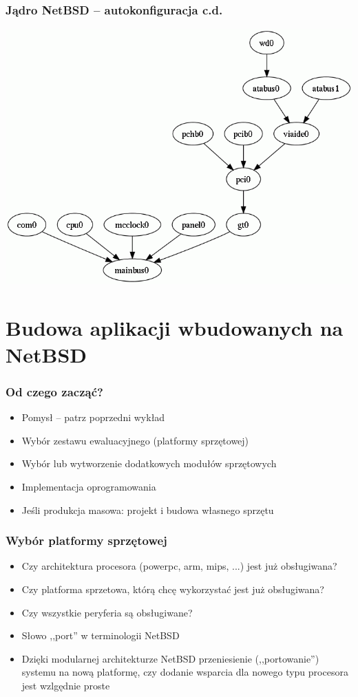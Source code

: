 \documentclass[dvipsnames,table]{beamer}
\begin{document}
\begin{frame}
\frametitle{Jądro NetBSD -- autokonfiguracja c.d.}
\begin{center}
	\includegraphics[scale=0.4]{img_cobaltdmesg.png}
\end{center}
\end{frame}

\section{Budowa aplikacji wbudowanych na NetBSD}

\begin{frame}
\frametitle{Od czego zacząć?}
\begin{itemize}
	\item Pomysł -- patrz poprzedni wykład {\Large \smiley}
	\item Wybór zestawu ewaluacyjnego (platformy sprzętowej)
	\item Wybór lub wytworzenie dodatkowych modułów sprzętowych
	\item Implementacja oprogramowania
	\item Jeśli produkcja masowa: projekt i budowa własnego sprzętu
\end{itemize}
\end{frame}	

\begin{frame}
\frametitle{Wybór platformy sprzętowej}
\begin{itemize}
	\item Czy architektura procesora (powerpc, arm, mips, ...) jest już obsługiwana? 
	\item Czy platforma sprzetowa, którą chcę wykorzystać jest już obsługiwana?
	\item Czy wszystkie peryferia są obsługiwane?
	\item Słowo ,,port'' w terminologii NetBSD
	\item Dzięki modularnej architekturze NetBSD przeniesienie (,,portowanie'') systemu na nową platformę, czy dodanie wsparcia dla nowego typu procesora jest wzlgędnie proste
\end{itemize}
\end{frame}
\end{document}

